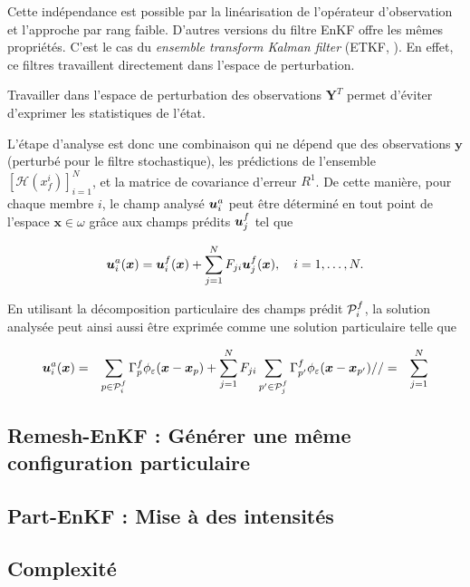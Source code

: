 Cette indépendance est possible par la linéarisation de l'opérateur d'observation et l'approche par rang faible. D'autres versions du filtre EnKF offre les mêmes propriétés. C'est le cas du \textit{ensemble transform Kalman filter} (ETKF, \cite{Hunt2007}). En effet, ce filtres travaillent directement dans l'espace de perturbation.

Travailler dans l'espace de perturbation des observations $\bm Y^T$ permet d'éviter d'exprimer les statistiques de l'état.

L'étape d'analyse est donc une combinaison qui ne dépend que des observations $\bm y$ (perturbé pour le filtre stochastique), les prédictions de l'ensemble $\left[\mathcal{H}(x^i_f)\right]_{i=1}^{N}$, et la matrice de covariance d'erreur $R^{1}$. De cette manière, pour chaque membre $i$, le champ analysé $\bm{u}_i^a$ peut être déterminé en tout point de l'espace $\bm x \in \omega$ grâce aux champs prédits $\bm{u}_j^f$ tel que

\begin{equation*}
    \bm{u}_i^a(\bm{x}) =\bm{u}_i^f(\bm{x}) + \sum_{j=1}^{N} F_{ji} \bm{u}_j ^f(\bm{x}), \quad i = 1, \dots, N.
\end{equation*}


En utilisant la décomposition particulaire des champs prédit $\mathcal{P}_i^f$, la solution analysée peut ainsi aussi être exprimée comme une solution particulaire telle que

\begin{eqnarray*}
    \bm{u}_i^a(\bm{x}) &=& \sum_{p \in \mathcal{P}_i^f}\Gamma^f_p \phi_{\varepsilon}(\bm{x} - \bm{x}_p) + \sum_{j=1}^{N} F_{ji}  \sum_{p' \in \mathcal{P}_j^f}\Gamma^f_{p'} \phi_{\varepsilon}(\bm{x} - \bm{x}_{p'}) //
    &=& \sum_{j=1}^{N}
\end{eqnarray*}



\subsection{Remesh-EnKF : Générer une même configuration particulaire}

\subsection{Part-EnKF : Mise à des intensités}

\subsection{Complexité}



